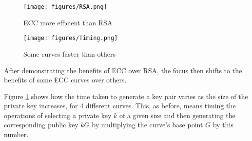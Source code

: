 \documentclass[12pt,a4paper]{article}
\begin{document}





\begin{figure}[!htb]
    \begin{minipage}{0.5\textwidth}
        \centering
        \texttt{[image: figures/RSA.png]}
        \caption{ECC more efficient than RSA}
        \label{fig:rsa}
    \end{minipage}\hfill
    \begin{minipage}{0.5\textwidth}
        \centering
        \texttt{[image: figures/Timing.png]}
        \caption{Some curves faster than others}
        \label{fig:curves}
    \end{minipage}
\end{figure}

\vspace{5mm}

After demonstrating the benefits of ECC over RSA, the focus then shifts to the benefits of some ECC curves over others. 

Figure \ref{fig:curves} shows how the time taken to generate a key pair varies as the size of the private key increases, for 4 different curves. 
This, as before, means timing the operations of selecting a private key $k$ of a given size and then generating the corresponding public key $kG$ by 
multiplying the curve's base point $G$ by this number. 
\end{document}
